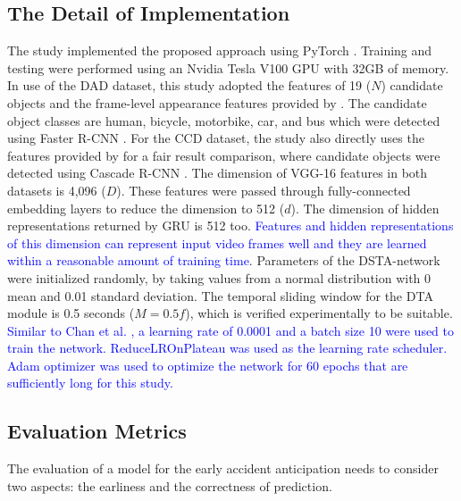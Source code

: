 \documentclass[journal]{IEEEtran}
\begin{document}
\subsection{The Detail of Implementation}
The study implemented the proposed approach using PyTorch \cite{paszke2019pytorch}. Training and testing were performed using an Nvidia Tesla V100 GPU with 32GB of memory. In use of the DAD dataset, this study adopted the features of 19 ($N$) candidate objects and the frame-level appearance features provided by \cite{chan2016anticipating}. The candidate object classes are human, bicycle, motorbike, car, and bus which were detected using Faster R-CNN \cite{ren2015faster}. For the CCD dataset, the study also directly uses the features provided by \cite{bao2020uncertainty} for a fair result comparison, where candidate objects were detected using Cascade R-CNN \cite{cai2018cascade}. The dimension of VGG-16 features in both datasets is 4,096 ($D$). These features were passed through fully-connected embedding layers to reduce the dimension to 512 ($d$). The dimension of hidden representations returned by GRU is 512 too. \textcolor{blue}{Features and hidden representations of this dimension can represent input video frames well and they are learned within a reasonable amount of training time}. Parameters of the DSTA-network were initialized randomly, by taking values from a normal distribution with 0 mean and 0.01 standard deviation.
The temporal sliding window for the DTA module is 0.5 seconds ($M=0.5f$), which is verified experimentally to be suitable. 
\textcolor{blue}{Similar to Chan et al. \cite{chan2016anticipating}, a learning rate of 0.0001 and a batch size 10 were used to train the network. ReduceLROnPlateau was used as the learning rate scheduler. Adam optimizer was used to optimize the network for 60 epochs that are sufficiently long for this study.}


\subsection{Evaluation Metrics}
The evaluation of a model for the early accident anticipation needs to consider two aspects: the earliness and the correctness of prediction. 
\end{document}
